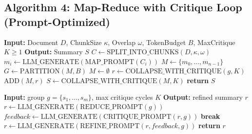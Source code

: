 \documentclass[11pt]{article}
\begin{document}
\clearpage

\subsection{Algorithm 4: Map-Reduce with Critique Loop (Prompt-Optimized)}

 
\begin{algorithm}
\caption{Map–Reduce with Critique Loop}
\label{alg:mapreduce_critique}
\begin{algorithmic}[1]
\State \textbf{Input:} Document $D$, ChunkSize $\kappa$, Overlap $\omega$, TokenBudget $B$, MaxCritique $K \ge 1$
\State \textbf{Output:} Summary $S$
\Statex {}
\State $C \gets \text{SPLIT\_INTO\_CHUNKS}(D, \kappa, \omega)$
    \State $m_i \gets \text{LLM\_GENERATE}(\text{MAP\_PROMPT}(C_i))$
\EndFor
\State $M \gets \{m_0, \dots, m_{n-1}\}$
\Statex {}
    \State $G \gets \text{PARTITION}(M, B)$ 
    \State $M \gets \emptyset$
        \State $r \gets \text{COLLAPSE\_WITH\_CRITIQUE}(g, K)$
        \State $\text{ADD}(M, r)$
    \EndFor
\EndWhile
\State $S \gets \text{COLLAPSE\_WITH\_CRITIQUE}(M, K)$ 
\State \textbf{return} $S$
\end{algorithmic}
\end{algorithm}

\begin{algorithm}
\caption{Subroutine: COLLAPSE\_WITH\_CRITIQUE}
\label{alg:sub_critique}
\begin{algorithmic}[1]
\State \textbf{Input:} group $g = \{s_1, \dots, s_m\}$, max critique cycles $K$
\State \textbf{Output:} refined summary $r$
\State $r \gets \text{LLM\_GENERATE}(\text{REDUCE\_PROMPT}(g))$ 
    \State $\textit{feedback} \gets \text{LLM\_GENERATE}(\text{CRITIQUE\_PROMPT}(r, g))$
        \State \textbf{break} 
    \EndIf
    \State $r \gets \text{LLM\_GENERATE}(\text{REFINE\_PROMPT}(r, \textit{feedback}, g))$
\EndFor
\State \textbf{return} $r$
\end{algorithmic}
\end{algorithm}
\end{document}
